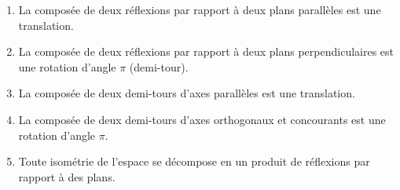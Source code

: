 \documentclass[11pt]{article}
\begin{document}
\begin{exercice}
\begin{enumerate}
    \item La composée de deux réflexions par rapport à deux plans parallèles est une translation.
    \item La composée de deux réflexions par rapport à deux plans perpendiculaires est une rotation d'angle $\pi$ (demi-tour).
    \item La composée de deux demi-tours d'axes parallèles est une translation.
    \item La composée de deux demi-tours d'axes orthogonaux et concourants est une rotation d'angle $\pi$.
    \item Toute isométrie de l'espace se décompose en un produit de réflexions par rapport à des plans.
\end{enumerate}
\end{exercice}
\end{document}
